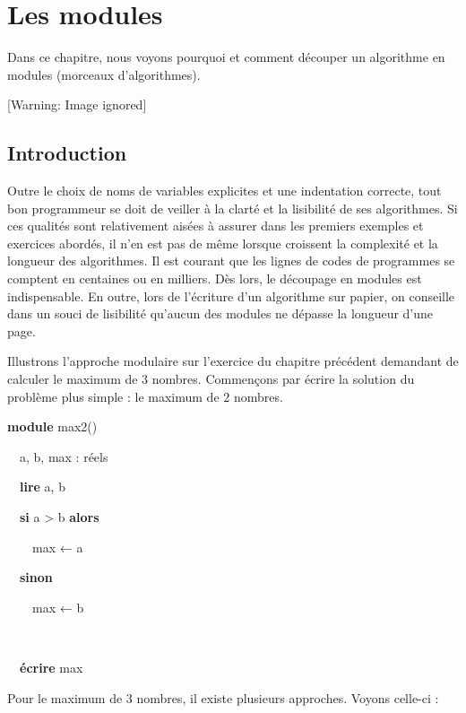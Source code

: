 \chapter[Les modules]{
Les modules}
{
Dans ce chapitre, nous voyons pourquoi et comment découper un algorithme
en modules (morceaux d'algorithmes). }

\begin{center}
 [Warning: Image ignored] %

\end{center}
\section{Introduction}
{
Outre le choix de noms de variables explicites et une indentation
correcte, tout bon programmeur se doit de veiller à la clarté et la
lisibilité de ses algorithmes. Si ces qualités sont relativement aisées
à assurer dans les premiers exemples et exercices abordés, il n’en est
pas de même lorsque croissent la complexité et la longueur des
algorithmes. Il est courant que les lignes de codes de programmes se
comptent en centaines ou en milliers. Dès lors, le découpage en modules
est indispensable. En outre, lors de l’écriture d’un algorithme sur
papier, on conseille dans un souci de lisibilité qu’aucun des modules
ne dépasse la longueur d’une page.}

{
Illustrons l’approche modulaire sur l’exercice du chapitre précédent
demandant de calculer le maximum de 3 nombres. Commençons par écrire la
solution du problème plus simple : le maximum de 2 nombres.}

{\sffamily
\textbf{module} max2()}

{\sffamily
\ \ a, b, max : réels}

{\sffamily
\ \ \textbf{lire} a, b}

{\sffamily
\ \ \textbf{si} a {\textgreater} b \textbf{alors}}

{\sffamily
\ \ \ \ max{ }{← a}}

{\sffamily
\ \ \textbf{sinon}}

{\sffamily
\ \ \ \ max{ }{← b}}

{\sffamily
\ \  }

{\sffamily
\ \ \textbf{écrire} max}

{\sffamily\bfseries
{}}

{
Pour le maximum de 3 nombres, il existe plusieurs approches. Voyons
celle-ci :}

